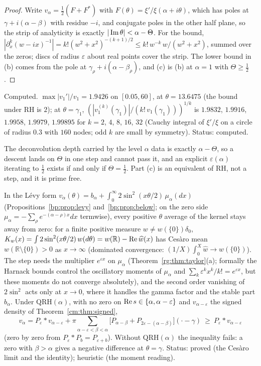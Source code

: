 \begin{proof}
Write $v_\alpha=\frac12(F+F^*)$ with $F(\theta)=\xi'/\xi(\alpha+i\theta)$, which has poles at $\gamma+i(\alpha-\beta)$ with residue $-i$, and conjugate poles in the other half plane, so the strip of analyticity is exactly $|\operatorname{Im}\theta|<\alpha-\Theta$. For the bound, $|\partial_x^k(w-ix)^{-1}|=k!(w^2+x^2)^{-(k+1)/2}\le k!\,w^{-k}\,w/(w^2+x^2)$, summed over the zeros; discs of radius $\varepsilon$ about real points cover the strip. The lower bound in (b) comes from the pole at $\gamma_\rho+i(\alpha-\beta_\rho)$, and (c) is (b) at $\alpha=1$ with $\Theta\ge\frac12$.
\end{proof}

Computed. $\max|v_1'|/v_1=1.9426$ on $[0.05,60]$, at $\theta=13.6475$ (the bound under RH is $2$); at $\theta=\gamma_1$, $(|v_1^{(k)}(\gamma_1)|/(k!\,v_1(\gamma_1)))^{1/k}$ is $1.9832$, $1.9916$, $1.9958$, $1.9979$, $1.99895$ for $k=2$, $4$, $8$, $16$, $32$ (Cauchy integral of $\xi'/\xi$ on a circle of radius $0.3$ with $160$ nodes; odd $k$ are small by symmetry). Status: computed.

The deconvolution depth carried by the level $\alpha$ data is exactly $\alpha-\Theta$, so a descent lands on $\Theta$ in one step and cannot pass it, and an explicit $\varepsilon(\alpha)$ iterating to $\frac12$ exists if and only if $\Theta=\frac12$. Part (c) is an equivalent of RH, not a step, and it is prime free.

\begin{remark}\label{rg:rem:sin2}
In the L\'evy form $v_\alpha(\theta)=b_\alpha+\int_0^\infty2\sin^2(x\theta/2)\,\mu_\alpha(dx)$ (Propositions~\ref{bp:prop:levy} and~\ref{bp:prop:below}; on the zero side $\mu_\alpha=-\sum_\rho e^{-(\alpha-\rho)x}dx$ termwise), every positive $\theta$ average of the kernel stays away from zero: for a finite positive measure $w\ne w(\{0\})\delta_0$, $K_w(x)=\int2\sin^2(x\theta/2)\,w(d\theta)=w(\mathbb R)-\operatorname{Re}\widehat w(x)$ has Ces\`aro mean $w(\mathbb R\setminus\{0\})>0$ as $x\to\infty$ (dominated convergence: $(1/X)\int_0^X\widehat w\to w(\{0\})$). The step needs the multiplier $e^{\varepsilon x}$ on $\mu_\alpha$ (Theorem~\ref{rg:thm:taylor}(a); formally the Harnack bounds control the oscillatory moments of $\mu_\alpha$ and $\sum_k\varepsilon^kx^k/k!=e^{\varepsilon x}$, but these moments do not converge absolutely), and the second order vanishing of $2\sin^2$ acts only at $x\to0$, where it handles the gamma factor and the stable part $b_\alpha$. Under $\mathrm{QRH}(\alpha)$, with no zero on $\operatorname{Re} s\in\{\alpha,\alpha-\varepsilon\}$ and $v_{\alpha-\varepsilon}$ the signed density of Theorem~\ref{cm:thm:signed},
\[v_\alpha=P_\varepsilon*v_{\alpha-\varepsilon}+\pi\sum_{\alpha-\varepsilon<\beta<\alpha}\big[P_{\alpha-\beta}+P_{2\varepsilon-(\alpha-\beta)}\big](\cdot-\gamma)\ \ge\ P_\varepsilon*v_{\alpha-\varepsilon}\]
(zero by zero from $P_\varepsilon*P_b=P_{\varepsilon+b}$). Without $\mathrm{QRH}(\alpha)$ the inequality fails: a zero with $\beta>\alpha$ gives a negative difference at $\theta=\gamma$. Status: proved (the Ces\`aro limit and the identity); heuristic (the moment reading).
\end{remark}

